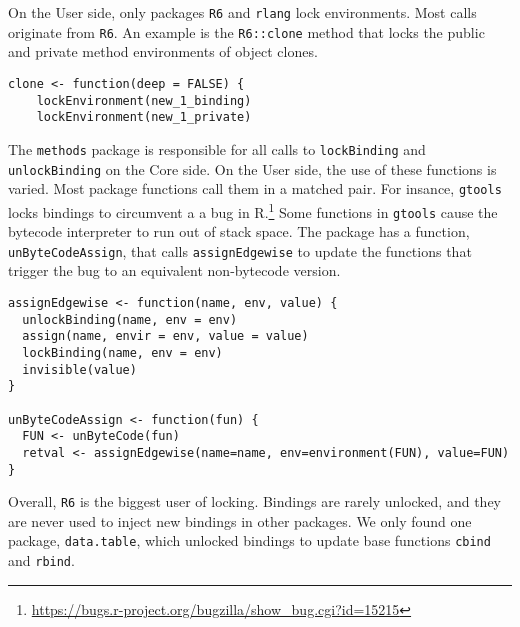 \documentclass[10pt,sigplan,authorversion=true]{acmart}
\renewcommand{\c}[1]{\lstinline |#1|\xspace}
\begin{document}
On the {User} side, only packages \c{R6} and \c{rlang} lock environments. Most
calls originate from \c{R6}. An example is the \c{R6::clone} method that locks
the public and private method environments of object clones.

\begin{lstlisting}
clone <- function(deep = FALSE) {
    lockEnvironment(new_1_binding)
    lockEnvironment(new_1_private)
\end{lstlisting}\medskip

The \c{methods} package is responsible for all calls to \c{lockBinding} and
\c{unlockBinding} on the {Core} side. On the {User} side, the use of these
functions is varied. Most package functions call them in a matched pair. For
insance, \c{gtools} locks bindings to circumvent a a bug in
R.\footnote{\url{https://bugs.r-project.org/bugzilla/show_bug.cgi?id=15215}}
Some functions in \c{gtools} cause the bytecode interpreter to run out of stack
space. The package has a function, \c{unByteCodeAssign}, that calls
\c{assignEdgewise} to update the functions that trigger the bug to an equivalent
non-bytecode version.

\begin{lstlisting}
assignEdgewise <- function(name, env, value) {
  unlockBinding(name, env = env)
  assign(name, envir = env, value = value)
  lockBinding(name, env = env)
  invisible(value)
}

unByteCodeAssign <- function(fun) {
  FUN <- unByteCode(fun)
  retval <- assignEdgewise(name=name, env=environment(FUN), value=FUN)
}
\end{lstlisting}\medskip

Overall, \c{R6} is the biggest user of locking. Bindings are rarely unlocked,
and they are never used to inject new bindings in other packages. We only found
one package, \c{data.table}, which unlocked bindings to update base functions
\c{cbind} and \c{rbind}.
\end{document}

